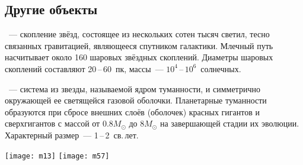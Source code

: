 \subsection{Другие объекты}
\begin{minipage}{0.63\tw}
~--- скопление звёзд, состоящее из нескольких сотен тысяч светил, тесно связанных гравитацией, являющееся спутником галактики. Млечный путь насчитывает около 160 шаровых звёздных скоплений. Диаметры шаровых скоплений составляют 20\,--\,60~пк, массы~--- $10^4$\,--\,$10^6$~солнечных.\par

~--- система из звезды, называемой ядром туманности, и симметрично окружающей ее светящейся газовой оболочки. Планетарные туманности образуются при сбросе внешних слоёв (оболочек) красных гигантов и сверхгигантов с массой от $0.8M_\odot$ до $8M_\odot$ на завершающей стадии их эволюции. Характерный размер~--- 1\,--\,2~св.\,лет.
\end{minipage}
\hfill
\begin{minipage}{0.32\tw}
	\centering
	\vspace{-1.2pc}
	\texttt{[image: m13]}
	\vspace{1pc}
	\texttt{[image: m57]}
\end{minipage}